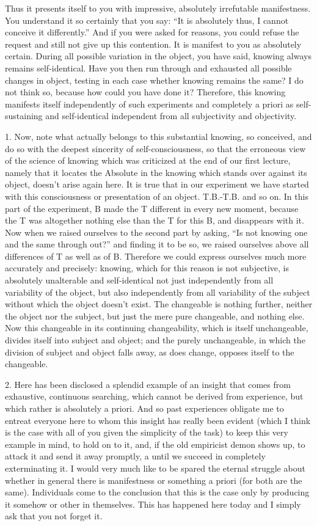Thus it presents itself to you with impressive,
absolutely irrefutable manifestness.
You understand it so certainly that you say:
“It is absolutely thus, I cannot conceive it differently.”
And if you were asked for reasons, you could
refuse the request and still not give up this contention.
It is manifest to you as absolutely certain.
During all possible variation in the object, you have said,
knowing always remains self-identical.
Have you then run through and exhausted all possible changes in object,
testing in each case whether knowing remains the same?
I do not think so, because how could you have done it?
Therefore, this knowing manifests itself independently of such experiments
and completely a priori as self-sustaining and self-identical
independent from all subjectivity and objectivity.

1. Now, note what actually belongs to this substantial knowing, so conceived,
and do so with the deepest sincerity of self-consciousness,
so that the erroneous view of the science of knowing
which was criticized at the end of our first lecture,
namely that it locates the Absolute in the knowing which
stands over against its object, doesn't arise again here.
It is true that in our experiment we have started with this consciousness
or presentation of an object. T.B.-T.B. and so on.
In this part of the experiment, B made the T different in every new moment,
because the T was altogether nothing else than the T for this B,
and disappears with it.
Now when we raised ourselves to the second part by asking,
“Is not knowing one and the same through out?” and
finding it to be so, we raised ourselves above all
differences of T as well as of B.
Therefore we could express ourselves much more accurately and precisely:
knowing, which for this reason is not subjective, is
absolutely unalterable and self-identical not just independently from all
variability of the object, but also independently from all variability of the
subject without which the object doesn't exist.
The changeable is nothing further, neither the object nor the subject,
but just the mere pure changeable, and nothing else.
Now this changeable in its continuing changeability,
which is itself unchangeable, divides itself into subject and object;
and the purely unchangeable, in which the division of subject and
object falls away, as does change, opposes itself to the changeable.

2. Here has been disclosed a splendid example of an insight that comes from
exhaustive, continuous searching, which cannot be derived from experience,
but which rather is absolutely a priori.
And so past experiences obligate me
to entreat everyone here to whom this insight has really been evident
(which I think is the case with all of you given the simplicity of the task)
to keep this very example in mind, to hold on to it, and,
if the old empiricist demon shows up,
to attack it and send it away promptly,
a until we succeed in completely exterminating it.
I would very much like to be spared the eternal struggle
about whether in general there is manifestness or something a priori
(for both are the same).
Individuals come to the conclusion that this is the case
only by producing it somehow or other in themselves.
This has happened here today and I simply ask that you not forget it.

